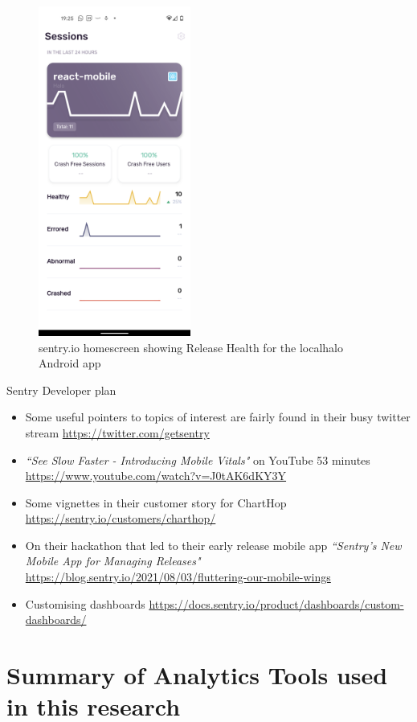 \begin{figure}
    \centering
    \includegraphics[width=5cm]{images/sentry.io/Screenshot_20210914-192538.png}
    \caption{sentry.io homescreen showing Release Health for the localhalo Android app}
    \label{fig:sentry-io-homescreen-release-health-for-localhalo-android}
\end{figure}


Sentry Developer plan 

\begin{itemize}
    \item Some useful pointers to topics of interest are fairly found in their busy twitter stream \url{https://twitter.com/getsentry}
    \item \emph{``See Slow Faster - Introducing Mobile Vitals"} on YouTube 53 minutes \url{https://www.youtube.com/watch?v=J0tAK6dKY3Y}
    \item Some vignettes in their customer story for ChartHop \url{https://sentry.io/customers/charthop/}
    \item On their hackathon that led to their early release mobile app \emph{``Sentry's New Mobile App for Managing Releases"}  \url{https://blog.sentry.io/2021/08/03/fluttering-our-mobile-wings}
    \item Customising dashboards \url{https://docs.sentry.io/product/dashboards/custom-dashboards/}
\end{itemize}

\section{Summary of Analytics Tools used in this research}
